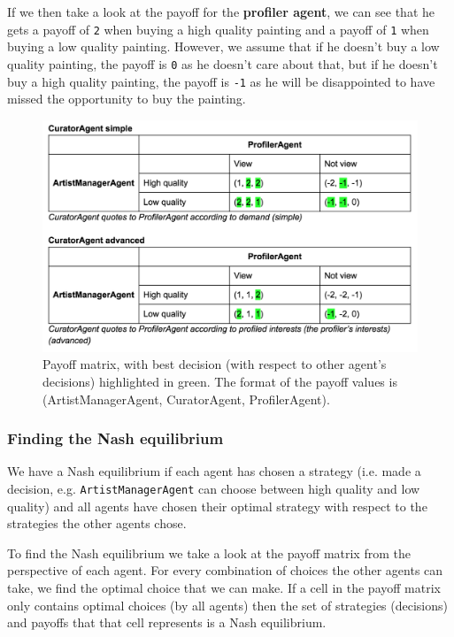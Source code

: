\documentclass[a4paper, 11pt]{article}
\begin{document}
If we then take a look at the payoff for the \textbf{profiler agent}, we can see that he gets a payoff of \texttt{2} when buying a high quality painting and a payoff of \texttt{1} when buying a low quality painting. However, we assume that if he doesn't buy a low quality painting, the payoff is \texttt{0} as he doesn't care about that, but if he doesn't buy a high quality painting, the payoff is \texttt{-1} as he will be disappointed to have missed the opportunity to buy the painting.


\begin{figure}[h]
    \centering
    \includegraphics[width=1.0\linewidth]{payoff_matrices.png}
    \caption{Payoff matrix, with best decision (with respect to other agent's decisions) highlighted in green. The format of the payoff values is (ArtistManagerAgent, CuratorAgent, ProfilerAgent).}
    \label{fig:payoff_matrices}
\end{figure}

\subsubsection{Finding the Nash equilibrium}

We have a Nash equilibrium if each agent has chosen a strategy (i.e. made a decision, e.g. \texttt{ArtistManagerAgent} can choose between high quality and low quality) and all agents have chosen their optimal strategy with respect to the strategies the other agents chose.

To find the Nash equilibrium we take a look at the payoff matrix from the perspective of each agent. For every combination of choices the other agents can take, we find the optimal choice that we can make. If a cell in the payoff matrix only contains optimal choices (by all agents) then the set of strategies (decisions) and payoffs that that cell represents is a Nash equilibrium.
\end{document}
